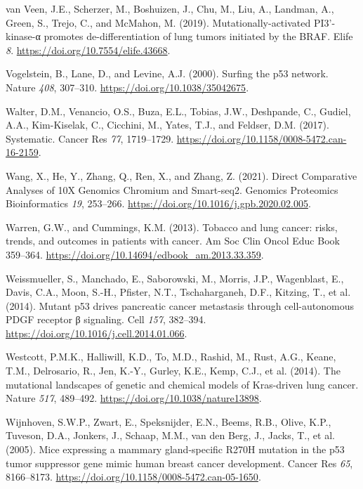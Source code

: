 \begin{CSLReferences}{0}{0}
\leavevmode{}%
van Veen, J.E., Scherzer, M., Boshuizen, J., Chu, M., Liu, A., Landman, A., Green, S., Trejo, C., and McMahon, M. (2019). Mutationally-activated PI3'-kinase-α promotes de-differentiation of lung tumors initiated by the BRAF. Elife \emph{8}. \url{https://doi.org/10.7554/elife.43668}.

\leavevmode{}%
Vogelstein, B., Lane, D., and Levine, A.J. (2000). Surfing the p53 network. Nature \emph{408}, 307--310. \url{https://doi.org/10.1038/35042675}.

\leavevmode{}%
Walter, D.M., Venancio, O.S., Buza, E.L., Tobias, J.W., Deshpande, C., Gudiel, A.A., Kim-Kiselak, C., Cicchini, M., Yates, T.J., and Feldser, D.M. (2017). Systematic. Cancer Res \emph{77}, 1719--1729. \url{https://doi.org/10.1158/0008-5472.can-16-2159}.

\leavevmode{}%
Wang, X., He, Y., Zhang, Q., Ren, X., and Zhang, Z. (2021). Direct Comparative Analyses of 10X Genomics Chromium and Smart-seq2. Genomics Proteomics Bioinformatics \emph{19}, 253--266. \url{https://doi.org/10.1016/j.gpb.2020.02.005}.

\leavevmode{}%
Warren, G.W., and Cummings, K.M. (2013). Tobacco and lung cancer: risks, trends, and outcomes in patients with cancer. Am Soc Clin Oncol Educ Book 359--364. \url{https://doi.org/10.14694/edbook_am.2013.33.359}.

\leavevmode{}%
Weissmueller, S., Manchado, E., Saborowski, M., Morris, J.P., Wagenblast, E., Davis, C.A., Moon, S.-H., Pfister, N.T., Tschaharganeh, D.F., Kitzing, T., et al. (2014). Mutant p53 drives pancreatic cancer metastasis through cell-autonomous PDGF receptor β signaling. Cell \emph{157}, 382--394. \url{https://doi.org/10.1016/j.cell.2014.01.066}.

\leavevmode{}%
Westcott, P.M.K., Halliwill, K.D., To, M.D., Rashid, M., Rust, A.G., Keane, T.M., Delrosario, R., Jen, K.-Y., Gurley, K.E., Kemp, C.J., et al. (2014). The mutational landscapes of genetic and chemical models of Kras-driven lung cancer. Nature \emph{517}, 489--492. \url{https://doi.org/10.1038/nature13898}.

\leavevmode{}%
Wijnhoven, S.W.P., Zwart, E., Speksnijder, E.N., Beems, R.B., Olive, K.P., Tuveson, D.A., Jonkers, J., Schaap, M.M., van den Berg, J., Jacks, T., et al. (2005). Mice expressing a mammary gland-specific R270H mutation in the p53 tumor suppressor gene mimic human breast cancer development. Cancer Res \emph{65}, 8166--8173. \url{https://doi.org/10.1158/0008-5472.can-05-1650}.


\end{CSLReferences}
